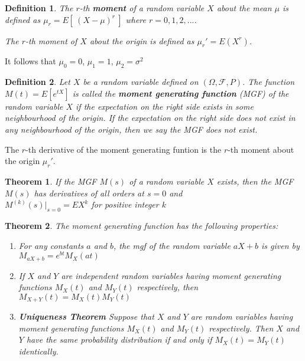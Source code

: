 \documentclass[12pt,twoside]{report}
\newtheorem{defn}{Definition}
\newtheorem{thm}{Theorem}
\begin{document}
\begin{defn}
    The $r$-th \textbf{moment} of a random variable $X$ about the mean $\mu$ is defined as $\mu_r = E[\  (X - \mu)^r \ ]$ where $r=0, 1, 2, ...$.

    The $r$-th moment of $X$ about the origin is defined as $\mu_r ' = E(X^r)$.
\end{defn}

It follows that $\mu_0 = 0$, $\mu_1 = 1$, $\mu_2 = \sigma ^2$

\begin{defn}
    Let $X$ be a random variable defined on $\left (\Omega,  \mathcal{F}, P\right )$. The function $M\left (t\right ) = E\left [e ^{t X}\right ]$ is called the \textbf{moment generating function} (MGF) of the random variable $X$ if the expectation on the right side exists in some neighbourhood of the origin. If the expectation on the right side does not exist in any neighbourhood of the origin, then we say the MGF does not exist.
\end{defn}

\begin{samepage}
The $r$-th derivative of the moment generating funtion is the $r$-th moment about the origin $\mu_r '$.
\begin{thm}
    If the MGF $M(s)$ of a random variable $X$ exists, then the MGF $M(s)$ has derivatives of all orders at $s=0$ and \\

    $M^{(k)} (s) |_{s=0} = EX^k$ for positive integer $k$
\end{thm}

\end{samepage}
\begin{thm}
    The moment generating function has the following properties:
    \begin{enumerate}
        \item For any constants $a$ and $b$, the mgf of the random variable $a X + b$ is given by $M_{aX+b} = e^{bt} M_X(at)$
        \item If $X$ and $Y$ are independent random variables having moment generating functions $M_X(t)$ and $M_Y(t)$ respectively, then $M_{X+Y}(t) = M_X(t) M_Y(t)$
        \item \textbf{Uniqueness Theorem} Suppose that $X$ and $Y$ are random variables having moment generating functions $M_X(t)$ and $M_Y(t)$ respectively. Then $X$ and $Y$ have the same probability distribution if and only if $M_X(t) = M_Y(t)$ identically.
    \end{enumerate}
\end{thm}
\end{document}
